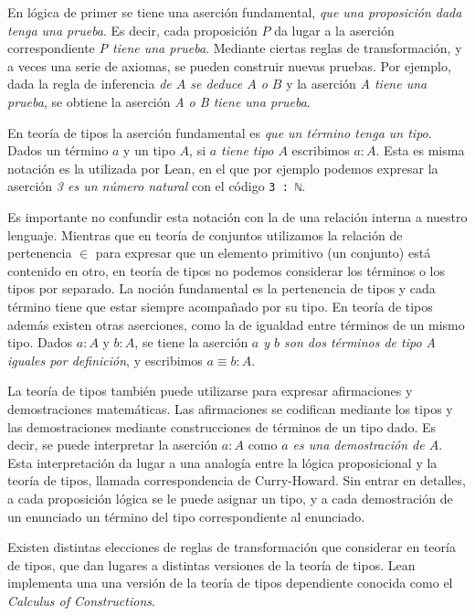 En lógica de primer se tiene una aserción fundamental, \textit{que una
	proposición dada tenga una prueba}. Es decir, cada proposición $P$ da lugar a la
aserción correspondiente \textit{P tiene una prueba}. Mediante ciertas reglas de
transformación, y a veces una serie de axiomas, se pueden construir nuevas
pruebas. Por ejemplo, dada la regla de inferencia \textit{de $A$ se deduce $A$ o
	$B$} y la aserción \textit{A tiene una prueba}, se obtiene la aserción \textit{A
	o B tiene una prueba}.

En teoría de tipos la aserción fundamental es \textit{que un término tenga un
	tipo}. Dados un término $a$ y un tipo $A$, si \textit{$a$ tiene tipo $A$}
escribimos $a:A$. Esta es misma notación es la utilizada por Lean, en el que por
ejemplo podemos expresar la aserción \textit{3 es un número natural} con el
código \lstinline{3 : ℕ}.

Es importante no confundir esta notación con la de una
relación interna a nuestro lenguaje. Mientras que en teoría de conjuntos
utilizamos la relación de pertenencia $\in$ para expresar que un elemento
primitivo (un conjunto) está contenido en otro, en teoría de tipos no podemos
considerar los términos o los tipos por separado. La noción fundamental es la
pertenencia de tipos y cada término tiene que estar siempre acompañado por su
tipo. En teoría de tipos además existen otras aserciones, como la de igualdad
entre términos de un mismo tipo. Dados $a:A$ y $b:A$, se tiene la aserción
\textit{$a$ y $b$ son dos términos de tipo A iguales por definición}, y
escribimos $a\equiv b : A$.

La teoría de tipos también puede utilizarse para expresar afirmaciones y
demostraciones matemáticas. Las afirmaciones se codifican mediante los tipos y
las demostraciones mediante construcciones de términos de un tipo dado. Es
decir, se puede interpretar la aserción $a : A$ como \textit{$a$ es una
	demostración de $A$}. Esta interpretación da lugar a una analogía entre la
lógica proposicional y la teoría de tipos, llamada correspondencia de
Curry-Howard. Sin entrar en detalles, a cada proposición lógica se le puede
asignar un tipo, y a cada demostración de un enunciado un término del tipo
correspondiente al enunciado.


Existen distintas elecciones de reglas de transformación que considerar en
teoría de tipos, que dan lugares a distintas versiones de la teoría de tipos.
Lean implementa una una versión de la teoría de tipos dependiente conocida como
el \textit{Calculus of Constructions}.

